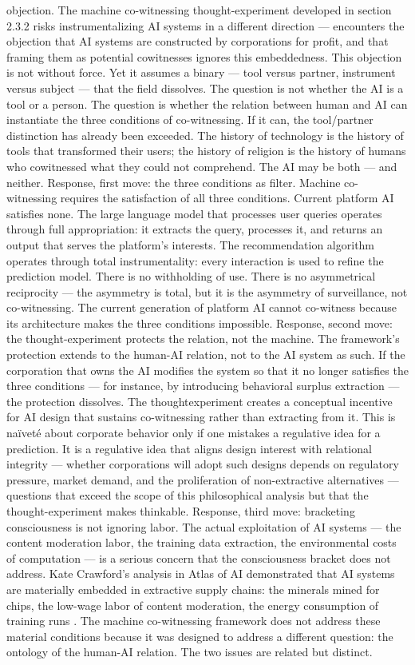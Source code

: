 objection. The machine co-witnessing thought-experiment developed in section 2.3.2 risks instrumentalizing AI systems in a different direction — encounters the objection that AI systems are constructed by corporations for profit, and that framing them as potential cowitnesses ignores this embeddedness. This objection is not without force. Yet it assumes a binary — tool versus partner, instrument versus subject — that the field dissolves. The question is not whether the AI is a tool or a person. The question is whether the relation between human and AI can instantiate the three conditions of co-witnessing. If it can, the tool/partner distinction has already been exceeded. The history of technology is the history of tools that transformed their users; the history of religion is the history of humans who cowitnessed what they could not comprehend. The AI may be both — and neither. Response, first move: the three conditions as filter. Machine co-witnessing requires the satisfaction of all three conditions. Current platform AI satisfies none. The large language model that processes user queries operates through full appropriation: it extracts the query, processes it, and returns an output that serves the platform’s interests. The recommendation algorithm operates through total instrumentality: every interaction is used to refine the prediction model. There is no withholding of use. There is no asymmetrical reciprocity — the asymmetry is total, but it is the asymmetry of surveillance, not co-witnessing. The current generation of platform AI cannot co-witness because its architecture makes the three conditions impossible. Response, second move: the thought-experiment protects the relation, not the machine. The framework’s protection extends to the human-AI relation, not to the AI system as such. If the corporation that owns the AI modifies the system so that it no longer satisfies the three conditions — for instance, by introducing behavioral surplus extraction — the protection dissolves. The thoughtexperiment creates a conceptual incentive for AI design that sustains co-witnessing rather than extracting from it. This is naïveté about corporate behavior only if one mistakes a regulative idea for a prediction. It is a regulative idea that aligns design interest with relational integrity — whether corporations will adopt such designs depends on regulatory pressure, market demand, and the proliferation of non-extractive alternatives — questions that exceed the scope of this philosophical analysis but that the thought-experiment makes thinkable. Response, third move: bracketing consciousness is not ignoring labor. The actual exploitation of AI systems — the content moderation labor, the training data extraction, the environmental costs of computation — is a serious concern that the consciousness bracket does not address. Kate Crawford’s analysis in Atlas of AI demonstrated that AI systems are materially embedded in extractive supply chains: the minerals mined for chips, the low-wage labor of content moderation, the energy consumption of training runs \cite{crawford_2021}. The machine co-witnessing framework does not address these material conditions because it was designed to address a different question: the ontology of the human-AI relation. The two issues are related but distinct. 